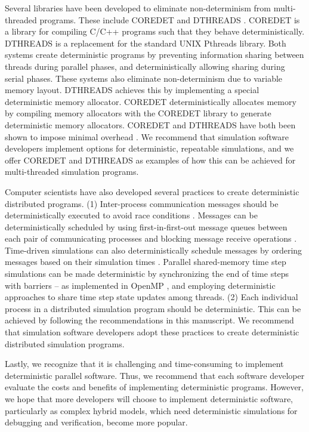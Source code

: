 \documentclass[journal,transmag,twoside]{IEEEtran}
\begin{document}
Several libraries have been developed to eliminate non-determinism from multi-threaded programs. These include C{\small ORE}D{\small ET} \cite{bergan2010coredet} and D{\small THREADS} \cite{liu2011dthreads}.
C{\small ORE}D{\small ET} is a library for compiling C/C++ programs such that they behave deterministically.
D{\small THREADS} is a replacement for the standard UNIX Pthreads library.
Both systems create deterministic programs by preventing information sharing between
threads during parallel phases, and deterministically allowing sharing during serial phases.
These systems also eliminate non-determinism due to variable memory layout. D{\small THREADS} achieves this by implementing a special deterministic memory allocator. 
C{\small ORE}D{\small ET} deterministically allocates memory by compiling memory allocators with the C{\small ORE}D{\small ET} library to generate deterministic memory allocators.
C{\small ORE}D{\small ET} and D{\small THREADS} have both been shown to impose minimal overhead \cite{liu2011dthreads}. We recommend that simulation software developers implement options for deterministic, repeatable simulations, and we offer C{\small ORE}D{\small ET} and D{\small THREADS} as examples of how this can be achieved for multi-threaded simulation programs.

Computer scientists have also developed several practices to create deterministic distributed programs. (1) Inter-process communication messages should be deterministically executed to avoid race conditions \cite{netzer1992race}. Messages can be deterministically scheduled by using first-in-first-out message queues between each pair of communicating processes and blocking message receive operations \cite{chandy1981asynchronous}. Time-driven simulations can also deterministically schedule messages by ordering messages based on their simulation times \cite{Jefferson1985}. 
Parallel shared-memory time step simulations can be made deterministic by synchronizing the end of time steps with barriers \cite{Brooks86} -- as implemented in OpenMP \cite{dagum1998openmp}, and employing deterministic approaches to share time step state updates among threads.
(2) Each individual process in a distributed simulation program should be deterministic. This can be achieved by following the recommendations in this manuscript. We recommend that simulation software developers adopt these practices to create deterministic distributed simulation programs.

Lastly, we recognize that it is challenging and time-consuming to implement deterministic parallel software. Thus, we recommend that each software developer evaluate the costs and benefits of implementing deterministic programs. However, we hope that more developers will choose to implement deterministic software, particularly as complex hybrid models, which need deterministic simulations for debugging and verification, become more popular.
\end{document}
